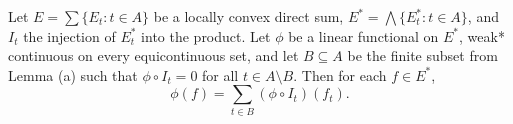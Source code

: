 Let $E = \sum \{E_t : t \in A\}$ be a locally convex direct sum, $E^* = \bigwedge \{E_t^* : t \in A\}$, and $I_t$ the injection of $E_t^*$ into the product. Let $\phi$ be a linear functional on $E^*$, weak* continuous on every equicontinuous set, and let $B \subseteq A$ be the finite subset from Lemma (a) such that $\phi \circ I_t = 0$ for all $t \in A \setminus B$. Then for each $f \in E^*$,
$$\phi(f) = \sum_{t \in B} (\phi \circ I_t)(f_t).$$
